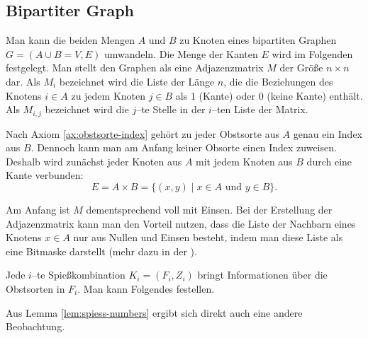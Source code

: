 \subsection{Bipartiter Graph}
Man kann die beiden Mengen $A$ und $B$ zu Knoten eines bipartiten Graphen $G = (A \cup B = V, E)$ umwandeln.
Die Menge der Kanten $E$ wird im Folgenden festgelegt.
Man stellt den Graphen als eine Adjazenzmatrix $M$ der Größe $n \times n$ dar. 
Als $M_i$ bezeichnet wird die Liste der Länge $n$,
die die Beziehungen des Knotens
$i \in A$ zu jedem Knoten $j \in B$ als 1 (Kante) oder 0 (keine Kante) enthält.
Als $M_{i, j}$ bezeichnet wird die $j$--te Stelle in der $i$--ten Liste der Matrix.

Nach Axiom \ref{ax:obstsorte-index} gehört zu jeder Obstsorte aus $A$ genau ein Index aus $B$.
Dennoch kann man am Anfang keiner Obsorte einen Index zuweisen.
Deshalb wird zunächst jeder Knoten aus $A$ mit jedem Knoten aus $B$ durch eine Kante verbunden:
\[
E = A\times B = \{(x, y) \mid  x \in A \text{ und } y \in B\}.
\]

Am Anfang ist $M$ dementsprechend voll mit Einsen.
Bei der Erstellung der Adjazenzmatrix kann man den Vorteil nutzen, dass die 
Liste der Nachbarn eines Knotens $x \in A$ nur aus Nullen und Einsen besteht, indem man
diese Liste als eine Bitmaske darstellt (mehr dazu in der ).

Jede $i$--te Spießkombination $K_i = (F_i, Z_i)$ bringt Informationen über die Obstsorten in $F_i$.
Man kann Folgendes festellen. 







\noindent Aus Lemma \ref{lem:spiess-numbers} ergibt sich direkt auch eine andere Beobachtung.




